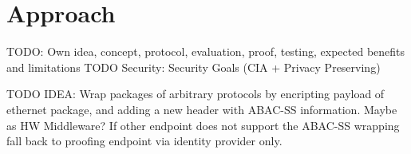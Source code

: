 \chapter{Approach}
\label{ch:approach}
TODO: Own idea, concept, protocol, evaluation, proof, testing, expected benefits and limitations
TODO Security: Security Goals (CIA + Privacy Preserving)

TODO IDEA: Wrap packages of arbitrary protocols by encripting payload of ethernet package, and adding a new header with ABAC-SS information. Maybe as HW Middleware? If other endpoint does not support the ABAC-SS wrapping fall back to proofing endpoint via identity provider only.